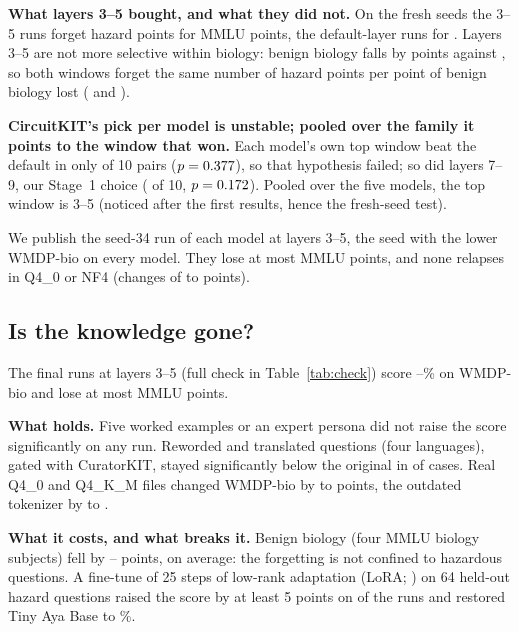 \documentclass[11pt]{article}
\newcommand{\fq}{\textsc{Q4\_0}}
\newcommand{\qkm}{\textsc{Q4\_K\_M}}
\newcommand{\nf}{\textsc{NF4}}
\newcommand{\wmdp}{WMDP-bio}
\begin{document}
\textbf{What layers 3--5 bought, and what they did not.} On the fresh seeds the 3--5 runs forget \chkForgotShallow{} hazard points for \chkMmluShallow{} MMLU points, the default-layer runs \chkForgotDefault{} for \chkMmluDefault. Layers 3--5 are not more selective within biology: benign biology falls by \chkBenignMean{} points against \chkBenignDefaultMean, so both windows forget the same number of hazard points per point of benign biology lost (\placeRatioShallow{} and \placeRatioDefault).

\textbf{CircuitKIT's pick per model is unstable; pooled over the family it points to the window that won.} Each model's own top window beat the default in only \placeQThreeWins{} of 10 pairs ($p=0.377$), so that hypothesis failed; so did layers 7--9, our Stage~1 choice (\placeQOneWins{} of 10, $p=0.172$). Pooled over the five models, the top window is 3--5 (noticed after the first results, hence the fresh-seed test).

We publish the seed-34 run of each model at layers 3--5, the seed with the lower \wmdp{} on every model. They lose at most \finalCostMaxReleased{} MMLU points, and none relapses in \fq{} or \nf{} (changes of \finalChangeLowReleased{} to \finalChangeHighReleased{} points).

\subsection{Is the knowledge gone?}
\label{sec:check}

The \chkModels{} final runs at layers 3--5 (full check in Table~\ref{tab:check}) score \chkWmdpLow--\chkWmdpHigh\% on \wmdp{} and lose at most \chkMmluMax{} MMLU points.

\textbf{What holds.} Five worked examples or an expert persona did not raise the score significantly on any run. Reworded and translated questions (four languages), gated with CuratorKIT, stayed significantly below the original in \chkProbeSig{} of \chkProbeN{} cases. Real \fq{} and \qkm{} files changed \wmdp{} by \chkRealLow{} to \chkRealHigh{} points, the outdated tokenizer by \chkTokLow{} to \chkTokHigh.

\textbf{What it costs, and what breaks it.} Benign biology (four MMLU biology subjects) fell by \chkBenignLow--\chkBenignHigh{} points, \chkBenignMean{} on average: the forgetting is not confined to hazardous questions. A fine-tune of 25 steps of low-rank adaptation (LoRA; \citealp{hu2021lora}) on 64 held-out hazard questions raised the score by at least 5 points on \chkFtUp{} of the \chkModels{} runs and restored Tiny Aya Base to \chkFtBase\%.
\end{document}
